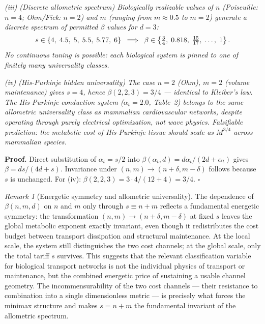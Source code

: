 \documentclass[11pt,a4paper]{article}
\theoremstyle{remark}
\newtheorem{remark}{Remark}
\begin{document}
\textit{(iii) (Discrete allometric spectrum) Biologically realizable values of $n$ (Poiseuille: $n=4$; Ohm/Fick: $n=2$) and $m$ (ranging from $m\approx 0.5$ to $m=2$) generate a discrete spectrum of permitted $\beta$ values for $d=3$:}
\begin{equation}
s \in \{4,\; 4.5,\; 5,\; 5.5,\; 5.77,\; 6\} \;\implies\; \beta \in
\left\{\tfrac{3}{4},\; 0.818{},\; \tfrac{15}{17},\; \ldots,\;
1\right\}.
\end{equation}
\textit{No continuous tuning is possible: each biological system is pinned to one of finitely many universality classes.}

\textit{(iv) (His-Purkinje hidden universality) The case $n=2$ (Ohm), $m=2$ (volume maintenance) gives $s=4$, hence $\beta(2,2,3) = 3/4$ --- identical to Kleiber's law. The His-Purkinje conduction system ($\alpha_t = 2.0$, Table~2) belongs to the \emph{same allometric universality class} as mammalian cardiovascular networks, despite operating through purely electrical optimization, not wave physics. Falsifiable prediction: the metabolic cost of His-Purkinje tissue should scale as $M^{3/4}$ across mammalian species.}

\noindent\textbf{Proof.} Direct substitution of $\alpha_t = s/2$ into $\beta(\alpha_t, d) = d\alpha_t/(2d+\alpha_t)$ gives $\beta = ds/(4d+s)$. Invariance under $(n,m)\to(n+\delta,m-\delta)$ follows because $s$ is unchanged. For (iv): $\beta(2,2,3) = 3\cdot 4/(12+4) = 3/4$. $\square$

\begin{remark}[Energetic symmetry and allometric universality]
The dependence of $\beta(n,m,d)$ on $n$ and $m$ only through $s \equiv n+m$
reflects a fundamental energetic symmetry: the transformation
$(n, m) \to (n+\delta, m-\delta)$ at fixed $s$ leaves the global metabolic
exponent exactly invariant, even though it redistributes the cost budget
between transport dissipation and structural maintenance. At the local scale,
the system still distinguishes the two cost channels; at the global scale,
only the total tariff $s$ survives. This suggests that the relevant
classification variable for biological transport networks is not the
individual physics of transport or maintenance, but the combined energetic
price of sustaining a usable channel geometry. The incommensurability of
the two cost channels --- their resistance to combination into a single
dimensionless metric --- is precisely what forces the minimax structure
and makes $s = n + m$ the fundamental invariant of the allometric spectrum.
\end{remark}
\end{document}
